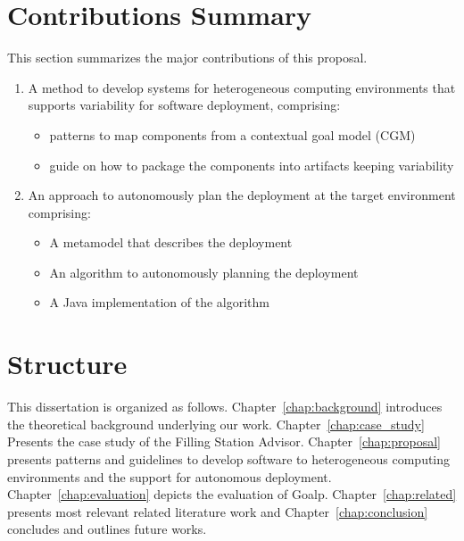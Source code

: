 
\section{Contributions Summary}

This section summarizes the major contributions of this proposal.

\begin{enumerate}

\item A method to develop systems for heterogeneous computing environments that supports variability for software deployment, comprising:
\begin{itemize}
  \item patterns to map components from a contextual goal model (CGM)
  \item guide on how to package the components into artifacts keeping variability
\end{itemize}

\item An approach to autonomously plan the deployment at the target environment comprising:
\begin{itemize}
  \item A metamodel that describes the deployment
  \item An algorithm to autonomously planning the deployment
  \item A Java implementation of the algorithm
\end{itemize}

\end{enumerate}

\section{Structure}

This dissertation is organized as follows. Chapter~\ref{chap:background} introduces the theoretical background underlying our work.  Chapter~\ref{chap:case_study} Presents the case study of the Filling Station Advisor. Chapter~\ref{chap:proposal} presents patterns and guidelines to develop software to heterogeneous computing environments and the support for autonomous deployment.
 Chapter~\ref{chap:evaluation} depicts the evaluation of Goalp.
 Chapter~\ref{chap:related} presents most relevant related literature work and Chapter~\ref{chap:conclusion} concludes and outlines future works.
